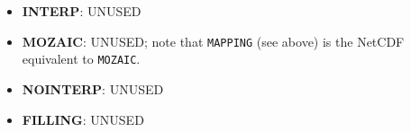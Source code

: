 \begin{itemize}






  {\bf Support of vector fields with the SCRIPR remappings}

  Vector mapping is NOT supported and will not be supported by
  OASIS3-MCT. For proper treatment of vector fields, the source 
  code has to send the 3 components of the vector projected in a
  Cartesian coordinate system as separate fields. The target 
  code has to received the 3 interpolated Cartesian components and
  recombine them to get the proper vector field.

\item {\bf INTERP}: UNUSED

\item {\bf MOZAIC}: UNUSED; note that {\tt MAPPING} (see above) is the
  NetCDF equivalent to {\tt MOZAIC}.

\item {\bf NOINTERP}: UNUSED

\item {\bf FILLING}: UNUSED

\end{itemize}

